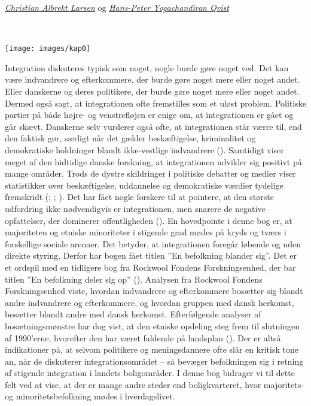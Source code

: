 \documentclass[
]{book}
\begin{document}

\thispagestyle{empty}

\emph{\href{https://vbn.aau.dk/en/persons/albrekt}{Christian Albrekt Larsen}} og \emph{\href{https://vbn.aau.dk/en/persons/hpq}{Hans-Peter Yogachandiran Qvist}}

~~~~

\texttt{[image: images/kap0]}

\newpage

Integration diskuteres typisk som noget, nogle burde gøre noget ved. Det kan være indvandrere og efterkommere, der burde gøre noget mere eller noget andet. Eller danskerne og deres politikere, der burde gøre noget mere eller noget andet. Dermed også sagt, at integrationen ofte fremstilles som et uløst problem. Politiske partier på både højre- og venstrefløjen er enige om, at integrationen er gået og går skævt. Danskerne selv vurderer også ofte, at integrationen står værre til, end den faktisk gør, særligt når det gælder beskæftigelse, kriminalitet og demokratiske holdninger blandt ikke-vestlige indvandrere (). Samtidigt viser meget af den hidtidige danske forskning, at integrationen udvikler sig positivt på mange områder. Trods de dystre skildringer i politiske debatter og medier viser statistikker over beskæftigelse, uddannelse og demokratiske værdier tydelige fremskridt (; ; ). Det har fået nogle forskere til at pointere, at den største udfordring ikke nødvendigvis er integrationen, men snarere de negative opfattelser, der dominerer offentligheden ().
En hovedpointe i denne bog er, at majoriteten og etniske minoriteter i stigende grad mødes på kryds og tværs i forskellige sociale arenaer. Det betyder, at integrationen foregår løbende og uden direkte styring. Derfor har bogen fået titlen ''En befolkning blander sig''. Det er et ordspil med en tidligere bog fra Rockwool Fondens Forskningsenhed, der bar titlen ''En befolkning deler sig op'' (). Analysen fra Rockwool Fondens Forskningsenhed viste, hvordan indvandrere og efterkommere bosætter sig blandt andre indvandrere og efterkommere, og hvordan gruppen med dansk herkomst, bosætter blandt andre med dansk herkomst. Efterfølgende analyser af bosætningsmønstre har dog vist, at den etniske opdeling steg frem til slutningen af 1990'erne, hvorefter den har været faldende på landsplan (). Der er altså indikationer på, at selvom politikere og meningsdannere ofte slår en kritisk tone an, når de diskuterer integrationsområdet -- så bevæger befolkningen sig i retning af stigende integration i landets boligområder. I denne bog bidrager vi til dette felt ved at vise, at der er mange andre steder end boligkvarteret, hvor majoritets- og minoritetsbefolkning mødes i hverdagslivet.
\end{document}
